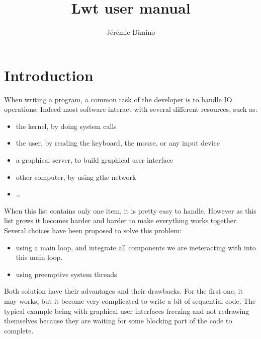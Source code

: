 \documentclass{article}
\title{Lwt user manual}
\author{Jérémie Dimino}
\begin{document}
\maketitle


\setcounter{tocdepth}{2}
\tableofcontents

\section{Introduction}

When writing a program, a common task of the developer is to handle IO
operations. Indeed most software interact with several different
resources, such as:

\begin{itemize}
\item the kernel, by doing system calls
\item the user, by reading the keyboard, the mouse, or any input
  device
\item a graphical server, to build graphical user interface
\item other computer, by using gthe network
\item \dots
\end{itemize}

When this list contains only one item, it is pretty easy to
handle. However as this list grows it becomes harder and harder to
make everything works together. Several choices have been proposed to
solve this problem:

\begin{itemize}
\item using a main loop, and integrate all components we are
  ineteracting with into this main loop.
\item using preemptive system threads
\end{itemize}

Both solution have their advantages and their drawbacks. For the first
one, it may works, but it become very complicated to write a bit of
sequential code. The typical example being with graphical user
interfaces freezing and not redrawing themselves because they are
waiting for some blocking part of the code to complete.
\end{document}
